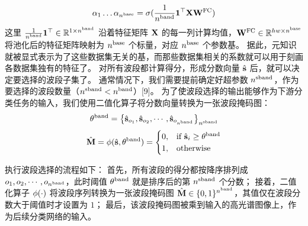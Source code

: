 \begin{equation}
    \alpha_1 \dots \alpha_{n^\text{base}} = \operatorname{\sigma}( \frac{1}{{n^\text{band}}} \mathbf{1}^\top \mathbf{X} \mathbf{W}^\text{FC} )
    \label{eqn:gcn-condconv-alpha}
\end{equation}
这里 $\frac{1}{{n^\text{band}}} \mathbf{1}^\top \in \mathbb{R}^{1 \times {n^\text{band}}}$ 沿着特征矩阵 $\mathbf{X}$ 的每一列计算均值，$\mathbf{W}^\text{FC} \in \mathbb{R}^{hw \times {n^\text{base}}}$ 将池化后的特征矩阵映射为 ${n^\text{base}}$ 个标量，对应 ${n^\text{base}}$ 个参数基。
据此，元知识就被显式表示为了这些数据集无关的基，而那些数据集相关的系数就可以用于刻画各数据集独有的特征了。
对所有波段都计算得分，形成分数向量 $\hat{\mathbf{s}}$ 后，就可以决定要选择的波段子集了。
通常情况下，我们需要提前确定好超参数 $n^\text{sband}$，作为要选择的波段数量（$n^\text{sband} < {n^\text{band}}$）[9]。
为了使波段选择的输出能够作为下游分类任务的输入，我们使用二值化算子将分数向量转换为一张波段掩码图：
\begin{equation}
    \theta^\text{band} = \left\{ \hat{\mathbf{s}}_{o_1}, \hat{\mathbf{s}}_{o_2}, \cdots, \hat{\mathbf{s}}_{o_{n^\text{band}}} \right\}_{n^\text{sband}}
    \label{eqn:threshold}
\end{equation}
\begin{equation}
    \hat{\mathbf{M}}
    = \phi(\hat{\mathbf{s}}, \theta^\text{band})
    =
    \begin{cases}
        0,&\text{if } \hat{\mathbf{s}}_{i} \geq \theta^\text{band} \\
        1,&\text{otherwise}
    \end{cases}
    \label{eqn:binarization}
\end{equation}
\par
执行波段选择的流程如下：
首先，所有波段的得分都按降序排列成 $o_1, o_2, \cdots, o_{{n^\text{band}}}$，此时阈值 $\theta^\text{band}$ 就是排序后的第 $n^\text{sband}$ 个分数；
接着，二值化算子 $\phi(\cdot)$ 将波段序列转换为一张波段掩码图 $\hat{\mathbf{M}} \in \{0,1\}^{{n^\text{band}}}$，其值仅在波段分数大于阈值时才设置为 $1$；
最后，该波段掩码图被乘到输入的高光谱图像上，作为后续分类网络的输入。

